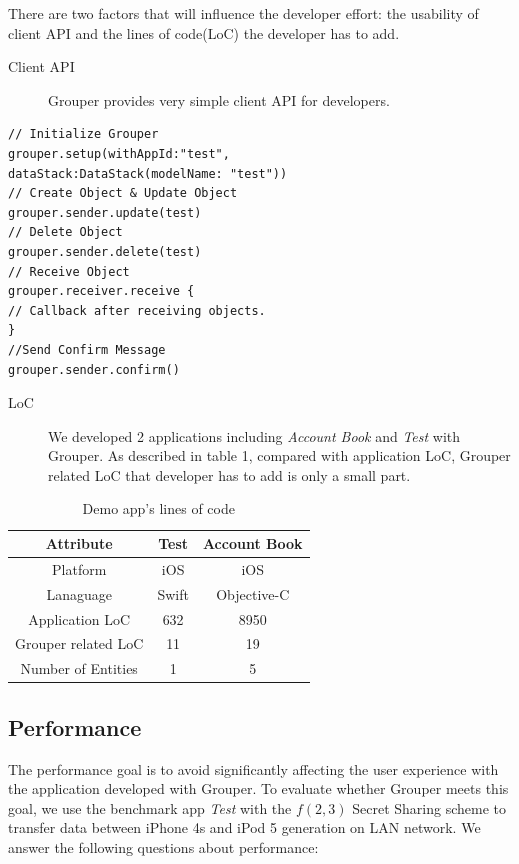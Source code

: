 \documentclass[twocolumn,10pt]{article}
\begin{document}
There are two factors that will influence the developer effort: the usability of client API and the lines of code(LoC) the developer has to add.

\begin{description}
	\item[Client API] Grouper provides very simple client API for developers.
\end{description}

\begin{lstlisting}
// Initialize Grouper
grouper.setup(withAppId:"test",
dataStack:DataStack(modelName: "test")) 
// Create Object & Update Object
grouper.sender.update(test)
// Delete Object
grouper.sender.delete(test)
// Receive Object
grouper.receiver.receive { 
// Callback after receiving objects.
}
//Send Confirm Message
grouper.sender.confirm()
\end{lstlisting}

\begin{description}
	\item[LoC] We developed 2 applications including \emph{Account Book} and \emph{Test} with Grouper. As described in table 1, compared with application LoC, Grouper related LoC that developer has to add is only a small part. 
\end{description}

\begin{table}[!htb]
	\centering
	\caption{Demo app's lines of code}
	\label{my-label}
	\begin{tabular}{c|c|c}
		\hline
		Attribute           & Test  & Account Book \\ \hline
		Platform            & iOS   & iOS          \\ \hline
		Lanaguage           & Swift & Objective-C  \\ \hline
		Application LoC     & 632   & 8950         \\ \hline
		Grouper related LoC & 11    & 19           \\ \hline
		Number of Entities  & 1     & 5            \\ \hline
	\end{tabular}
\end{table}

\subsection{Performance}

The performance goal is to avoid significantly affecting the user experience with the application developed with Grouper. To evaluate whether Grouper meets this goal, we use the benchmark app \emph{Test} with the $f(2, 3)$ Secret Sharing scheme to transfer data between iPhone 4s and iPod 5 generation on LAN network. We answer the following questions about performance:
\end{document}

